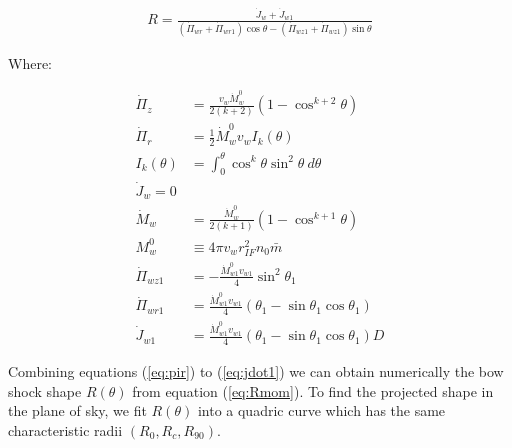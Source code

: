 \begin{align}
  R = \frac{\dot{J}_w + \dot{J}_{w1}}{\left(\dot{\Pi}_{wr}+\dot{\Pi}_{wr1}\right)\cos\theta-\left(\dot{\Pi}_{wz1}+\dot{\Pi}_{wz1}\right)\sin\theta}
  \label{eq:Rmom}
\end{align}

Where:

\begin{align}
\dot{\Pi}_z &= \frac{v_w\dot{M}_w^0}{2(k+2)}\left(1-\cos^{k+2}\theta\right)  \label{eq:pir}\\
\dot{\Pi}_r &= \frac{1}{2}\dot{M}^0_w v_w I_k (\theta) \label{eq:piz}\\
I_k(\theta) & = \int^\theta_0 \cos^k \theta \sin^2\theta~d\theta \label{eq:Ik}\\
\dot{J}_w = 0 \label{eq:jdot} \\
\dot{M}_w &= \frac{\dot{M}_w^0}{2(k+1)}\left(1-\cos^{k+1}\theta\right) \label{eq:dotprop} \\
M^0_w &\equiv 4\pi v_w r^2_{IF} n_0 \bar{m}\\
\dot{\Pi}_{wz1} & = -\frac{\dot{M}^0_{w1}v_{w1}}{4}\sin^2\theta_1\\
\dot{\Pi}_{wr1} & = \frac{\dot{M}^0_{w1}v_{w1}}{4}\left(\theta_1-\sin\theta_1\cos\theta_1\right)\\
\dot{J}_{w1} & = \frac{\dot{M}^0_{w1}v_{w1}}{4}\left(\theta_1-\sin\theta_1\cos\theta_1\right)D \label{eq:jdot1}
\end{align}

Combining equations  (\ref{eq:pir}) to (\ref{eq:jdot1}) we can obtain numerically the bow shock shape $R(\theta)$ from equation (\ref{eq:Rmom}).
To find the projected shape in the plane of sky, we fit $R(\theta)$ into a quadric curve which has the same characteristic radii $(R_0,R_c,R_{90})$. 

